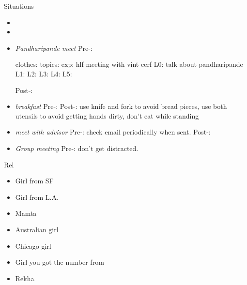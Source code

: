 \begin{frame}
\begin{columns}
\begin{column}{0.20\linewidth}
      \begin{block}{Situations}

        \begin{itemize} 

        \item \tiny \item 
          \tiny \item \tiny {} \textit{Pandharipande
            meet} Pre-: 

          clothes: 
          topics: exp: hlf meeting with vint cerf L0: talk about pandharipande  L1:    L2:     L3:  L4:   L5: 

           Post-: 
          
           \tiny \item \tiny \textit{breakfast} Pre-: Post-: use knife and
           fork to avoid bread pieces, use both utensils to avoid
           getting hands dirty, don't eat while standing 
          \tiny \item \tiny \textit{meet with advisor} Pre-: check
          email periodically when sent. Post-: 
        \item \tiny \textit{Group meeting} Pre-: don't get
          distracted. 
        \end{itemize} 

      \end{block}




      
\begin{block}{Rel}
  \begin{itemize} 
    \small \item \small Girl from SF 
    \small \item \small Girl from L.A. 
    \small \item \small Mamta 


    \item \small Australian girl
    \small \item \small Chicago girl 
    \small \item \small Girl you got the number from 
    \small \item \small Rekha


\end{itemize}
\end{block}
\end{column}
\end{columns}
\end{frame}
